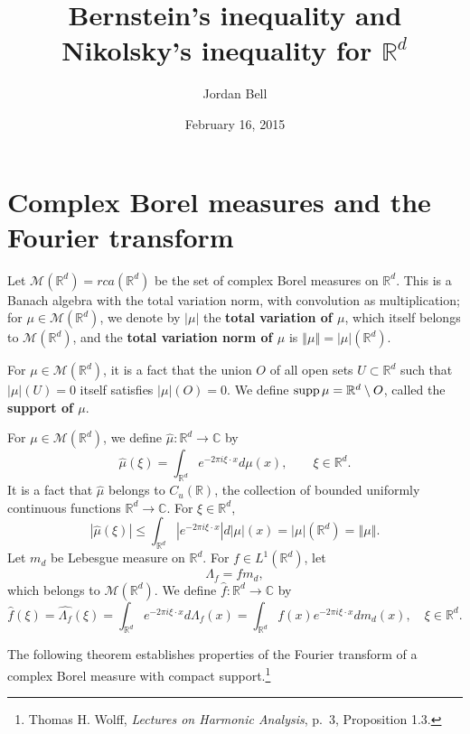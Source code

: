 \documentclass{article}
\newcommand{\supp}{\ensuremath\mathrm{supp}\,}
\newcommand{\norm}[1]{\left\Vert #1 \right\Vert}
\theoremstyle{definition}
\begin{document}
\title{Bernstein's inequality and Nikolsky's inequality for $\mathbb{R}^d$}
\author{Jordan Bell}
\date{February 16, 2015}

\maketitle

\section{Complex Borel measures and the Fourier transform}
Let $\mathcal{M}(\mathbb{R}^d)=rca(\mathbb{R}^d)$ be the set of complex Borel measures on $\mathbb{R}^d$.  This is a Banach
algebra with the total variation norm, with convolution as multiplication; for $\mu \in \mathcal{M}(\mathbb{R}^d)$, we denote by $|\mu|$ the \textbf{total variation of $\mu$}, which
itself belongs to $\mathcal{M}(\mathbb{R}^d)$, and the \textbf{total variation norm of $\mu$} is $\norm{\mu}=|\mu|(\mathbb{R}^d)$.


For $\mu \in \mathcal{M}(\mathbb{R}^d)$, it is a fact that the union $O$ of all open sets $U \subset \mathbb{R}^d$ such that
$|\mu|(U)=0$ itself satisfies $|\mu|(O)=0$. We define $\supp \mu = \mathbb{R}^d \setminus O$, called the \textbf{support of $\mu$}.

For $\mu \in \mathcal{M}(\mathbb{R}^d)$, we define $\hat{\mu}:\mathbb{R}^d \to \mathbb{C}$ by
\[
\hat{\mu}(\xi) = \int_{\mathbb{R}^d} e^{-2\pi i\xi\cdot x} d\mu(x), \qquad
\xi \in \mathbb{R}^d.
\]
It is a fact that  $\hat{\mu}$ belongs to $C_u(\mathbb{R})$, the collection of bounded uniformly continuous functions $\mathbb{R}^d \to \mathbb{C}$.
For $\xi \in \mathbb{R}^d$,
\begin{equation}
|\hat{\mu}(\xi)| \leq \int_{\mathbb{R}^d} |e^{-2\pi i\xi\cdot x}| d|\mu|(x)
=|\mu|(\mathbb{R}^d) = \norm{\mu}.
\label{TVnorm}
\end{equation}
Let $m_d$ be Lebesgue measure on $\mathbb{R}^d$.
For $f \in L^1(\mathbb{R}^d)$, let
\[
\Lambda_f = f m_d,
\]
which belongs to $\mathcal{M}(\mathbb{R}^d)$. We define $\hat{f}:\mathbb{R}^d \to \mathbb{C}$ by
\[
\hat{f}(\xi)  = \widehat{\Lambda_f}(\xi) = \int_{\mathbb{R}^d} e^{-2\pi i\xi\cdot x} d\Lambda_f(x)=
\int_{\mathbb{R}^d} f(x) e^{-2\pi i\xi\cdot x} dm_d(x),
\quad \xi \in \mathbb{R}^d.
\]

The following theorem establishes properties of the Fourier transform of a complex Borel measure with compact support.\footnote{Thomas H. Wolff,
{\em Lectures on Harmonic Analysis}, p.~3, Proposition 1.3.}
\end{document}
